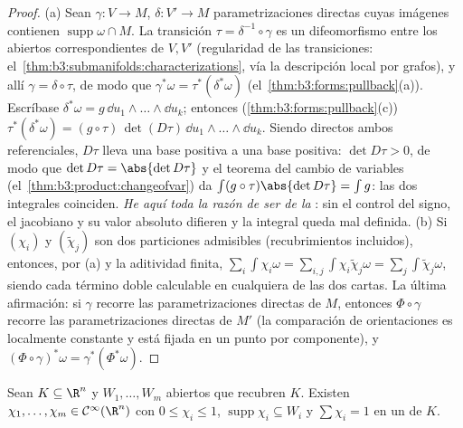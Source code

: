 \begin{proof}
(a) Sean $\gamma\colon V \to M$, $\delta\colon V' \to M$
parametrizaciones directas cuyas imágenes contienen
$\operatorname{supp}\omega\cap M$. La transición $\tau =
\delta^{-1}\circ\gamma$ es un difeomorfismo entre los abiertos
correspondientes de $V, V'$ (regularidad de las transiciones:
el~\cref{thm:b3:submanifolds:characterizations}, vía la descripción
local por grafos), y allí $\gamma = \delta\circ\tau$, de modo que
$\gamma^*\omega = \tau^*(\delta^*\omega)$
(el~\cref{thm:b3:forms:pullback}(a)). Escríbase $\delta^*\omega =
g\,\dd u_1\wedge\dots\wedge\dd u_k$; entonces
(\cref{thm:b3:forms:pullback}(c)) $\tau^*(\delta^*\omega) =
(g\circ\tau)\,\det(D\tau)\,\dd u_1\wedge\dots\wedge\dd u_k$.
Siendo directos ambos referenciales, $D\tau$ lleva una base positiva a
una base positiva: $\det D\tau > 0$, de modo que $\det D\tau =
\abs{\det D\tau}$ y el teorema del cambio de variables
(el~\cref{thm:b3:product:changeofvar}) da
$\int(g\circ\tau)\abs{\det D\tau} = \int g$: las dos integrales
coinciden. \emph{He aquí toda la razón de ser de la
}: sin el control del
signo, el jacobiano y su valor absoluto difieren y la integral queda mal
definida. (b) Si $(\chi_i)$ y $(\tilde\chi_j)$ son dos particiones
admisibles (recubrimientos incluidos), entonces, por (a) y la aditividad
finita, $\sum_i\int\chi_i\omega =
\sum_{i,j}\int\chi_i\tilde\chi_j\omega =
\sum_j\int\tilde\chi_j\omega$, siendo cada término doble calculable en
cualquiera de las dos cartas. La última afirmación: si $\gamma$ recorre
las parametrizaciones directas de $M$, entonces $\Phi\circ\gamma$
recorre las parametrizaciones directas de $M'$ (la comparación de
orientaciones es localmente constante
y está fijada en un punto por componente), y
$(\Phi\circ\gamma)^*\omega =
\gamma^*(\Phi^*\omega)$.
\end{proof}

\begin{lemma}
\label{lem:b3:forms:partition}
Sean $K \subseteq \R^n$  y
$W_1, \dots, W_m$ abiertos que
recubren $K$. Existen $\chi_1, \dots, \chi_m \in
\mathcal C^\infty(\R^n)$ con $0 \leq \chi_i \leq 1$,
$\operatorname{supp}\chi_i \subseteq W_i$
 y $\sum\chi_i = 1$ en un
 de $K$.
\end{lemma}

